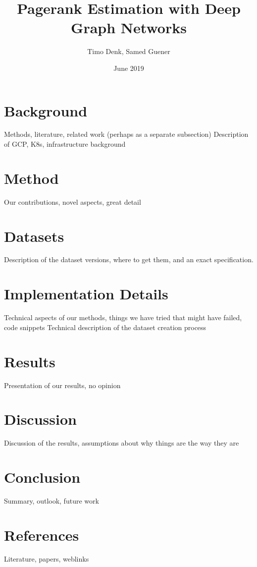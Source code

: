 \documentclass{article}
\title{Pagerank Estimation with Deep Graph Networks}
\author{Timo Denk, Samed Guener}
\date{June 2019}
\begin{document}
\maketitle



\section{Background}
Methods, literature, related work (perhaps as a separate subsection)
Description of GCP, K8s, infrastructure background

\section{Method}
Our contributions, novel aspects, great detail

\section{Datasets}
Description of the dataset versions, where to get them, and an exact specification.

\section{Implementation Details}
Technical aspects of our methods, things we have tried that might have failed, code snippets
Technical description of the dataset creation process

\section{Results}
Presentation of our results, no opinion

\section{Discussion}
Discussion of the results, assumptions about why things are the way they are

\section{Conclusion}
Summary, outlook, future work

\section{References}
Literature, papers, weblinks
\end{document}
